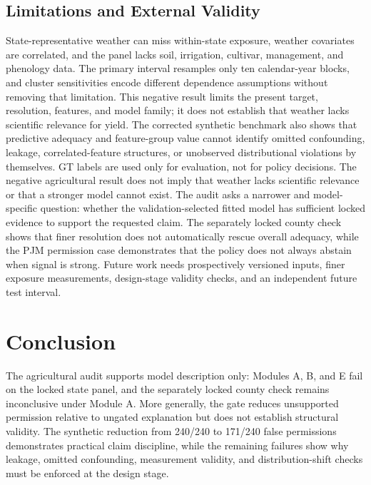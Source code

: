 \documentclass[conference]{IEEEtran}
\begin{document}
\subsection{Limitations and External Validity}
State-representative weather can miss within-state exposure, weather covariates
are correlated, and the panel lacks soil, irrigation, cultivar, management, and
phenology data. The primary interval resamples only ten calendar-year blocks, and
cluster sensitivities encode different dependence assumptions without removing
that limitation. This negative result limits the present target, resolution,
features, and model family; it does not establish that weather lacks scientific
relevance for yield. The corrected synthetic benchmark also shows that predictive
adequacy and feature-group value cannot identify omitted confounding, leakage,
correlated-feature structures, or unobserved distributional violations by
themselves. GT labels are used only for evaluation, not for policy decisions.
The negative agricultural result does not imply that weather lacks scientific
relevance or that a stronger model cannot exist. The audit asks a narrower and
model-specific question: whether the validation-selected fitted model has
sufficient locked evidence to support the requested claim. The separately locked
county check shows that finer resolution does not automatically rescue overall
adequacy, while the PJM permission case demonstrates that the policy does not
always abstain when signal is strong.
Future work needs prospectively versioned inputs, finer exposure measurements,
design-stage validity checks, and an independent future test interval.

\section{Conclusion}
The agricultural audit supports model description only: Modules A, B, and E fail
on the locked state panel, and the separately locked county check remains
inconclusive under Module A. More generally, the gate reduces unsupported
permission relative to ungated explanation but does not establish structural
validity. The synthetic reduction from 240/240 to 171/240 false permissions
demonstrates practical claim discipline, while the remaining failures show why
leakage, omitted confounding, measurement validity, and distribution-shift checks
must be enforced at the design stage.



\end{document}
